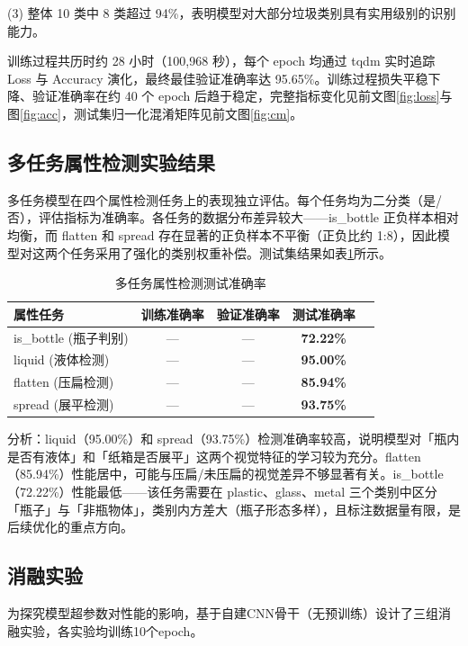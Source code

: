 \documentclass[11pt,a4paper]{ctexart}
\newcommand{\figref}[1]{图\ref{#1}}
\newcommand{\tabref}[1]{表\ref{#1}}
\begin{document}
(3) 整体 10 类中 8 类超过 94\%，表明模型对大部分垃圾类别具有实用级别的识别能力。

\vspace{4pt}
训练过程共历时约 28 小时（100,968 秒），每个 epoch 均通过 tqdm 实时追踪 Loss 与 Accuracy 演化，最终最佳验证准确率达 95.65\%。训练过程损失平稳下降、验证准确率在约 40 个 epoch 后趋于稳定，完整指标变化见前文\figref{fig:loss}与\figref{fig:acc}，测试集归一化混淆矩阵见前文\figref{fig:cm}。

\subsection{多任务属性检测实验结果}

多任务模型在四个属性检测任务上的表现独立评估。每个任务均为二分类（是/否），评估指标为准确率。各任务的数据分布差异较大——is\_bottle 正负样本相对均衡，而 flatten 和 spread 存在显著的正负样本不平衡（正负比约 1:8），因此模型对这两个任务采用了强化的类别权重补偿。测试集结果如\tabref{tab:taskacc}所示。

\begin{table}[H]
\centering
\caption{多任务属性检测测试准确率}
\label{tab:taskacc}
\begin{tabular}{lcccc}
\toprule
\textbf{属性任务} & \textbf{训练准确率} & \textbf{验证准确率} & \textbf{测试准确率} \\
\midrule
is\_bottle (瓶子判别) & — & — & \textbf{72.22\%} \\
liquid (液体检测)    & — & — & \textbf{95.00\%} \\
flatten (压扁检测)   & — & — & \textbf{85.94\%} \\
spread (展平检测)    & — & — & \textbf{93.75\%} \\
\bottomrule
\end{tabular}
\end{table}

分析：liquid（95.00\%）和 spread（93.75\%）检测准确率较高，说明模型对「瓶内是否有液体」和「纸箱是否展平」这两个视觉特征的学习较为充分。flatten（85.94\%）性能居中，可能与压扁/未压扁的视觉差异不够显著有关。is\_bottle（72.22\%）性能最低——该任务需要在 plastic、glass、metal 三个类别中区分「瓶子」与「非瓶物体」，类别内方差大（瓶子形态多样），且标注数据量有限，是后续优化的重点方向。

\subsection{消融实验}

为探究模型超参数对性能的影响，基于自建CNN骨干（无预训练）设计了三组消融实验，各实验均训练10个epoch。
\end{document}
